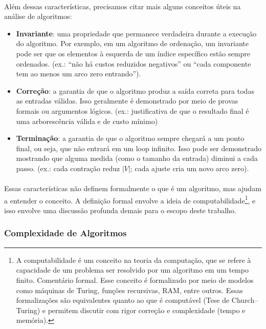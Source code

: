 \documentclass[12pt,a4paper]{article}
\def\emph#1{#1}%
\begin{document}
\paragraph{}
Além dessas características, precisamos citar mais alguns conceitos úteis na análise de algoritmos:
\begin{itemize}\setlength{\itemsep}{2pt}
    \item \textbf{Invariante}: uma propriedade que permanece verdadeira durante a execução do algoritmo. Por exemplo, em um algoritmo de ordenação, um invariante pode ser que os elementos à esquerda de um índice específico estão sempre ordenados. (ex.: “não há custos reduzidos negativos” ou “cada componente tem ao menos um arco zero entrando”).
    \item \textbf{Correção}: a garantia de que o algoritmo produz a saída correta para todas as entradas válidas. Isso geralmente é demonstrado por meio de provas formais ou argumentos lógicos. (ex.: justificativa de que o resultado final é uma arborescência válida e de custo mínimo)
    \item \textbf{Terminação}: a garantia de que o algoritmo sempre chegará a um ponto final, ou seja, que não entrará em um loop infinito. Isso pode ser demonstrado mostrando que alguma medida (como o tamanho da entrada) diminui a cada passo. (ex.: cada contração reduz $|V|$; cada ajuste cria um novo arco zero).
\end{itemize}

\paragraph{}
Essas características não definem formalmente o que é um algoritmo, mas ajudam a entender o conceito. A definição formal envolve a ideia de \emph{computabilidade}\footnote{A computabilidade é um conceito na teoria da computação, que se refere à capacidade de um problema ser resolvido por um algoritmo em um tempo finito. \emph{Comentário formal.} Esse conceito é formalizado por meio de modelos como máquinas de Turing, funções recursivas, RAM, entre outros. Essas formalizações são equivalentes quanto ao que é computável (Tese de Church–Turing) e permitem discutir com rigor correção e complexidade (tempo e memória).}, e isso envolve uma discussão profunda demais para o escopo deste trabalho.

\subsubsection{Complexidade de Algoritmos}
\end{document}
